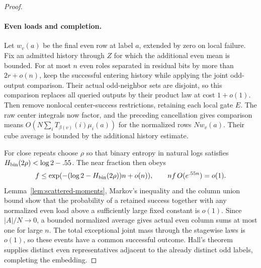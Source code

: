 \begin{proof}
\paragraph{Even loads and completion.}

Let \(w_v(a)\) be the final even row at label \(a\), extended by zero
on local failure. Fix an admitted history through \(Z\) for which the
additional even mean is bounded. For at most \(n\) even roles separated
in residual bits by more than \(2r+o(n)\), keep the successful entering
history while applying the joint odd-output comparison. Their actual
odd-neighbor sets are disjoint, so this comparison replaces all queried
outputs by their product law at cost \(1+o(1)\).
Then remove nonlocal center-success restrictions, retaining each local
gate \(E\). The raw center integrals now factor, and the preceding
cancellation gives comparison means
\(O(N\sum_iT_{\beta(v)}(i)\mu_i(a))\) for the normalized rows
\(Nw_v(a)\). Their cube average is bounded by the additional history
estimate.

For close repeats choose \(\rho\) so that binary entropy in natural
logs satisfies \(H_{\rm bin}(2\rho)<\log2-.55\).
The near fraction then obeys
\[
 f\le\exp(-(\log2-H_{\rm bin}(2\rho))n+o(n)),
 \qquad nf\,O(e^{.55n})=o(1).
\]
Lemma~\ref{lem:scattered-moments}, Markov's inequality and the column
union bound show that the probability of a retained success together
with any normalized even load above a sufficiently large fixed constant
is \(o(1)\). Since \(|A|/N\to0\), a bounded normalized average gives
actual even column sums at most one for large \(n\). The total exceptional joint mass
through the stagewise laws is \(o(1)\), so these events have a common
successful outcome. Hall's theorem supplies distinct even representatives
adjacent to the already distinct odd labels, completing the embedding.

\end{proof}


